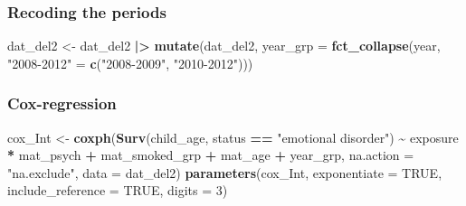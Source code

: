 \documentclass[
]{article}
\newenvironment{Shaded}{\begin{snugshade}}{\end{snugshade}}
\newcommand{\AttributeTok}[1]{\textcolor[rgb]{0.13,0.29,0.53}{#1}}
\newcommand{\ConstantTok}[1]{\textcolor[rgb]{0.56,0.35,0.01}{#1}}
\newcommand{\DecValTok}[1]{\textcolor[rgb]{0.00,0.00,0.81}{#1}}
\newcommand{\FunctionTok}[1]{\textcolor[rgb]{0.13,0.29,0.53}{\textbf{#1}}}
\newcommand{\NormalTok}[1]{#1}
\newcommand{\OtherTok}[1]{\textcolor[rgb]{0.56,0.35,0.01}{#1}}
\newcommand{\SpecialCharTok}[1]{\textcolor[rgb]{0.81,0.36,0.00}{\textbf{#1}}}
\newcommand{\StringTok}[1]{\textcolor[rgb]{0.31,0.60,0.02}{#1}}
\begin{document}
\subsubsection{Recoding the periods}\label{recoding-the-periods}

\begin{Shaded}
\begin{Highlighting}[]
\NormalTok{dat\_del2 }\OtherTok{\textless{}{-}}\NormalTok{ dat\_del2 }\SpecialCharTok{|\textgreater{}} \FunctionTok{mutate}\NormalTok{(dat\_del2,}
                               \AttributeTok{year\_grp =} \FunctionTok{fct\_collapse}\NormalTok{(year, }\StringTok{"2008{-}2012"} \OtherTok{=} \FunctionTok{c}\NormalTok{(}\StringTok{"2008{-}2009"}\NormalTok{, }\StringTok{"2010{-}2012"}\NormalTok{)))}
\end{Highlighting}
\end{Shaded}

\subsubsection{Cox-regression}\label{cox-regression}

\begin{Shaded}
\begin{Highlighting}[]
\NormalTok{cox\_Int }\OtherTok{\textless{}{-}} \FunctionTok{coxph}\NormalTok{(}\FunctionTok{Surv}\NormalTok{(child\_age, }
\NormalTok{                      status }\SpecialCharTok{==} \StringTok{"emotional disorder"}\NormalTok{) }\SpecialCharTok{\textasciitilde{}}\NormalTok{ exposure }\SpecialCharTok{*}\NormalTok{ mat\_psych }\SpecialCharTok{+}\NormalTok{ mat\_smoked\_grp }\SpecialCharTok{+}\NormalTok{ mat\_age }\SpecialCharTok{+}\NormalTok{ year\_grp,}
                 \AttributeTok{na.action =} \StringTok{"na.exclude"}\NormalTok{,}
                 \AttributeTok{data =}\NormalTok{ dat\_del2)}
\FunctionTok{parameters}\NormalTok{(cox\_Int, }\AttributeTok{exponentiate =} \ConstantTok{TRUE}\NormalTok{, }\AttributeTok{include\_reference =} \ConstantTok{TRUE}\NormalTok{, }\AttributeTok{digits =} \DecValTok{3}\NormalTok{)}
\end{Highlighting}
\end{Shaded}
\end{document}
